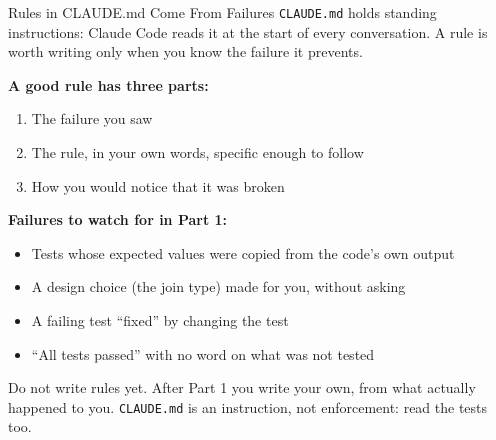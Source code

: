\documentclass[aspectratio=169, 11pt]{beamer}
\begin{document}
\begin{frame}{Rules in CLAUDE.md Come From Failures}
  \texttt{CLAUDE.md} holds standing instructions: Claude Code reads it at the start of every conversation. A rule is worth writing only when you know the failure it prevents.

  \vspace{0.5em}
  \textbf{A good rule has three parts:}
  \begin{enumerate}
    \item The failure you saw
    \item The rule, in your own words, specific enough to follow
    \item How you would notice that it was broken
  \end{enumerate}

  \vspace{0.5em}
  \textbf{Failures to watch for in Part 1:}
  \begin{itemize}
    \small
    \item Tests whose expected values were copied from the code's own output
    \item A design choice (the join type) made for you, without asking
    \item A failing test ``fixed'' by changing the test
    \item ``All tests passed'' with no word on what was not tested
  \end{itemize}

  \vspace{0.5em}
  \alert{Do not write rules yet. After Part 1 you write your own, from what actually happened to you.} \texttt{CLAUDE.md} is an instruction, not enforcement: read the tests too.
\end{frame}

\end{document}
